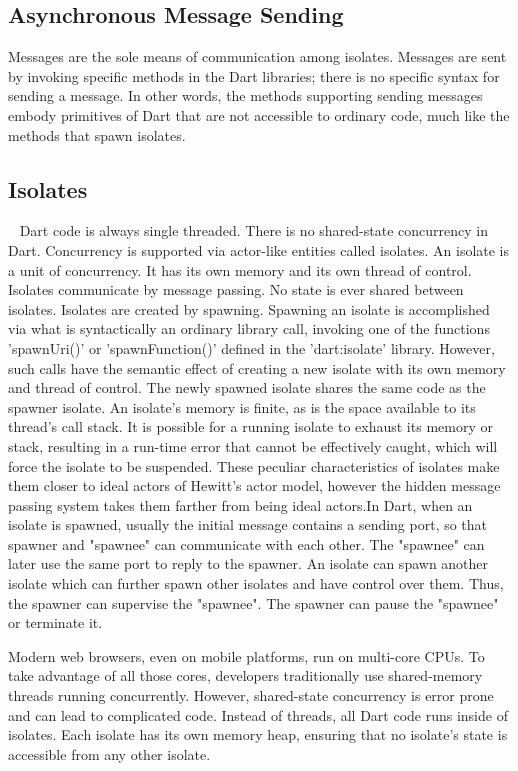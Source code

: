  \subsection{Asynchronous Message Sending}
  Messages are the sole means of communication among isolates. Messages are sent by invoking specific methods in the Dart libraries; there is no specific syntax for sending a message.
  In other words, the methods supporting sending messages embody primitives of Dart that are not accessible to ordinary code, much like the methods that spawn isolates.
  \subsection{Isolates}~\parencite{dartEcma}
  \label{sec:isolates}
  Dart code is always single threaded. There is no shared-state concurrency in Dart. Concurrency is supported via actor-like entities called isolates.
  An isolate is a unit of concurrency. It has its own memory and its own thread of control. Isolates communicate by message passing. No state is ever shared between isolates. Isolates are created by spawning.
  Spawning an isolate is accomplished via what is syntactically an ordinary library call, invoking one of the functions 'spawnUri()' or 'spawnFunction()' defined in the 'dart:isolate' library. However, such calls have the semantic effect of creating a new isolate with its own memory and thread of control.
  The newly spawned isolate shares the same code as the spawner isolate. \cite{dartApiIsolate}
  An isolate’s memory is finite, as is the space available to its thread’s call stack. It is possible for a running isolate to exhaust its memory or stack, resulting in a run-time error that cannot be effectively caught, which will force the isolate to be suspended.
  These peculiar characteristics of isolates make them closer to ideal actors of Hewitt’s actor model, however the hidden message passing system takes them farther from being ideal actors.In Dart, when an isolate is spawned, usually the initial message contains a sending port, so that spawner and "spawnee" can communicate with each other. The "spawnee" can later use the same port to reply to the spawner. An isolate can spawn another isolate which can further spawn other isolates and have control over them. Thus, the spawner can supervise the "spawnee". The spawner can pause the "spawnee" or terminate it.

  Modern web browsers, even on mobile platforms, run on multi-core CPUs. To take advantage of all those cores, developers traditionally use shared-memory threads running concurrently. However, shared-state concurrency is error prone and can lead to complicated code.
  Instead of threads, all Dart code runs inside of isolates. Each isolate has its own memory heap, ensuring that no isolate’s state is accessible from any other isolate. ~\parencite{laddWalrath}

